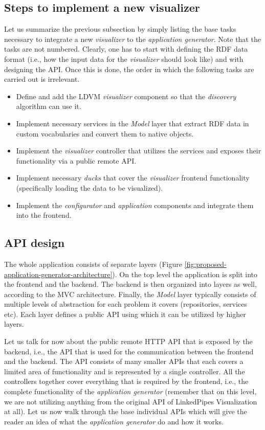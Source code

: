 \subsection{Steps to implement a new visualizer}

Let us summarize the previous subsection by simply listing the base tasks necessary to integrate a new \emph{visualizer} to the \emph{application generator}. Note that the tasks are not numbered. Clearly, one has to start with defining the RDF data format (i.e., how the input data for the \emph{visualizer} should look like) and with designing the API. Once this is done, the order in which the following tasks are carried out is irrelevant.

\begin{itemize}
\item Define and add the LDVM \emph{visualizer} component so that the \emph{discovery} algorithm can use it.
\item Implement necessary services in the \emph{Model} layer that extract RDF data in custom vocabularies and convert them to native objects.
\item Implement the \emph{visualizer} controller that utilizes the services and exposes their functionality via a public remote API.
\item Implement necessary \emph{ducks} that cover the \emph{visualizer} frontend functionality (specifically loading the data to be visualized).
\item Implement the \emph{configurator} and \emph{application} components and integrate them into the frontend. 
\end{itemize}

\subsection{API design}

The whole application consists of separate layers (Figure \ref{fig:proposed-application-generator-architecture}). On the top level the application is split into the frontend and the backend. The backend is then organized into layers as well, according to the MVC architecture. Finally, the \emph{Model} layer typically consists of multiple levels of abstraction for each problem it covers (repositories, services etc). Each layer defines a public API using which it can be utilized by higher layers.

Let us talk for now about the public remote HTTP API that is exposed by the backend, i.e., the API that is used for the communication between the frontend and the backend. The API consists of many smaller APIs that each covers a limited area of functionality and is represented by a single controller. All the controllers together cover everything that is required by the frontend, i.e., the complete functionality of the \emph{application generator} (remember that on this level, we are not utilizing anything from the original API of LinkedPipes Visualization at all). Let us now walk through the base individual APIs which will give the reader an idea of what the \emph{application generator} do and how it works.

